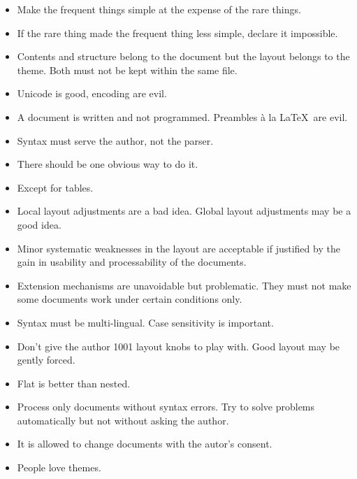\documentclass[12pt,openany]{book}
\begin{document}
\begin{itemize}
\item Make the frequent things simple at the expense of the rare things.

\item If the rare thing made the frequent thing less simple, declare it
  impossible.

\item Contents and structure belong to the document but the layout belongs to
  the theme.  Both must not be kept within the same file.

\item Unicode is good, encoding are evil.

\item A document is written and not programmed.  Preambles à la \LaTeX\ are
  evil.

\item Syntax must serve the author, not the parser.

\item There should be one obvious way to do it.

\item Except for tables.

\item Local layout adjustments are a bad idea.  Global layout adjustments may
  be a good idea.

\item Minor systematic weaknesses in the layout are acceptable if justified by
  the gain in usability and processability of the documents.

\item Extension mechanisms are unavoidable but problematic.  They must not make
  some documents work under certain conditions only.
  
\item Syntax must be multi-lingual.  Case sensitivity is important.
  
\item Don't give the author 1001 layout knobs to play with.  Good layout may be
  gently forced.
  
\item Flat is better than nested.

\item Process only documents without syntax errors.  Try to solve problems
  automatically but not without asking the author.

\item It is allowed to change documents with the autor's consent.

\item People love themes.
\end{itemize}
\end{document}
